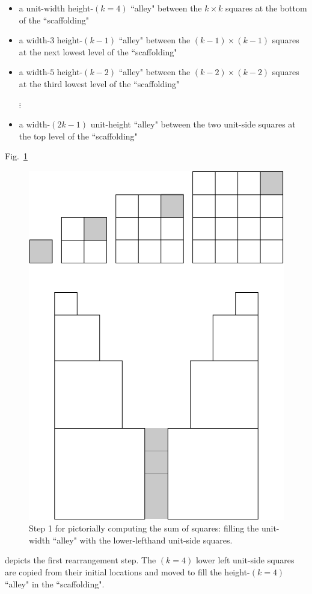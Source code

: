 \begin{itemize}
\item
a unit-width height-$(k=4)$ ``alley" between the $k \times k$ squares at the bottom of the ``scaffolding"
\item
a width-$3$ height-$(k-1)$ ``alley" between the $(k-1) \times (k-1)$ squares at the next lowest level of the ``scaffolding"
\item
a width-$5$ height-$(k-2)$ ``alley" between the $(k-2) \times (k-2)$ squares at the third lowest level of the ``scaffolding"

\hspace*{.5in}$\vdots$
\item
a width-$(2k-1)$ unit-height ``alley" between the two unit-side squares at the top level of the ``scaffolding"
\end{itemize}

\medskip

Fig.~\ref{fig:sumSquares2}
\begin{figure}[htb]
\begin{center}
       \includegraphics[scale=0.3]{FiguresMaths/SumSquares2}
\caption{Step 1 for pictorially computing the sum of squares: filling the unit-width ``alley" with the lower-lefthand unit-side squares.}
       \label{fig:sumSquares2}
\end{center}
\end{figure}
depicts the first rearrangement step.  The $(k=4)$ lower left unit-side squares are copied from their initial locations and moved to fill the height-$(k=4)$ ``alley" in the ``scaffolding".

